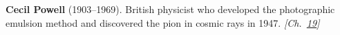 \nobelphysics \textbf{Cecil Powell} (1903–1969). British physicist who developed the photographic emulsion method and discovered the pion in cosmic rays in 1947. \emph{[Ch.~\hyperref[ch:cosmicraymuons]{19}]}

